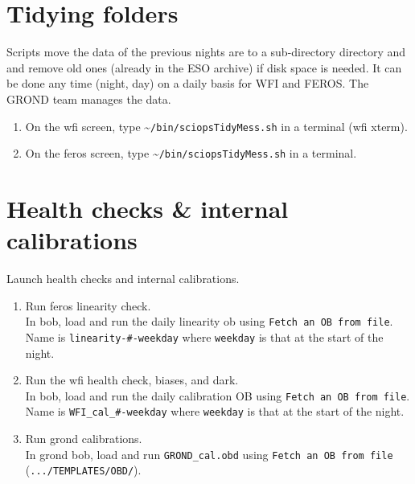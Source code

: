 \documentclass[11pt,fleqn,a4paper]{book}
\begin{document}
\section{Tidying folders}

Scripts move the data of the previous nights are to a sub-directory directory and and remove old ones (already in the ESO archive) if disk space is needed.  It can be done any time (night, day) on a daily basis for WFI and FEROS.  The GROND team manages the data.

\begin{enumerate}
  \item On the \gls{wfi} screen, type \~{}\texttt{/bin/sciopsTidyMess.sh} in a terminal (wfi xterm).
  \item On the \gls{feros} screen, type \~{}\texttt{/bin/sciopsTidyMess.sh} in a terminal.
\end{enumerate}

\section{Health checks \& internal calibrations}
\label{sec:clocal}

Launch health checks and internal calibrations.

\begin{enumerate}
  \item Run \gls{feros} linearity check.\\
        In \gls{bob}, load and run the daily linearity \gls{ob} using \texttt{Fetch an OB from file}.\\
        Name is \texttt{linearity-\#-weekday} where \texttt{weekday} is that at the start of the night.
  \item Run the \gls{wfi} health check, biases, and dark.\\
        In \gls{bob}, load and run the daily calibration OB using \texttt{Fetch an OB from file}.\\
        Name is \texttt{WFI\_cal\_\#-weekday} where \texttt{weekday} is that at the start of the night.
  \item Run \gls{grond} calibrations.\\
        In \gls{grond} \gls{bob}, load and run \texttt{GROND\_cal.obd} using \texttt{Fetch an OB from file}\\ 
        (\texttt{.../TEMPLATES/OBD/}). 
\end{enumerate}
\end{document}
